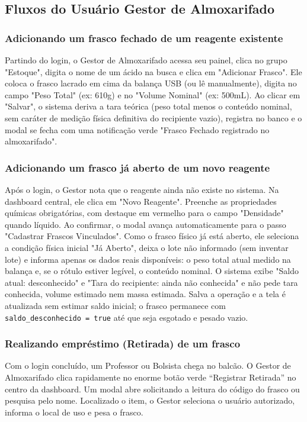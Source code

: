 \subsection{Fluxos do Usuário Gestor de Almoxarifado}

\subsubsection{Adicionando um frasco fechado de um reagente existente}
Partindo do login, o Gestor de Almoxarifado acessa seu painel, clica no grupo "Estoque", digita o nome de um ácido na busca e clica em "Adicionar Frasco". Ele coloca o frasco lacrado em cima da balança USB (ou lê manualmente), digita no campo "Peso Total" (ex: 610g) e no "Volume Nominal" (ex: 500mL). Ao clicar em "Salvar", o sistema deriva a tara teórica (peso total menos o conteúdo nominal, sem caráter de medição física definitiva do recipiente vazio), registra no banco e o modal se fecha com uma notificação verde "Frasco Fechado registrado no almoxarifado".

\subsubsection{Adicionando um frasco já aberto de um novo reagente}
Após o login, o Gestor nota que o reagente ainda não existe no sistema. Na dashboard central, ele clica em "Novo Reagente". Preenche as propriedades químicas obrigatórias, com destaque em vermelho para o campo "Densidade" quando líquido. Ao confirmar, o modal avança automaticamente para o passo "Cadastrar Frascos Vinculados". Como o frasco físico já está aberto, ele seleciona a condição física inicial "Já Aberto", deixa o lote não informado (sem inventar lote) e informa apenas os dados reais disponíveis: o peso total atual medido na balança e, se o rótulo estiver legível, o conteúdo nominal. O sistema exibe "Saldo atual: desconhecido" e "Tara do recipiente: ainda não conhecida" e não pede tara conhecida, volume estimado nem massa estimada. Salva a operação e a tela é atualizada sem estimar saldo inicial; o frasco permanece com \texttt{saldo\_desconhecido = true} até que seja esgotado e pesado vazio.

\subsubsection{Realizando empréstimo (Retirada) de um frasco}
Com o login concluído, um Professor ou Bolsista chega no balcão. O Gestor de Almoxarifado clica rapidamente no enorme botão verde ``Registrar Retirada'' no centro da dashboard. Um modal abre solicitando a leitura do código do frasco ou pesquisa pelo nome. Localizado o item, o Gestor seleciona o usuário autorizado, informa o local de uso e pesa o frasco.

